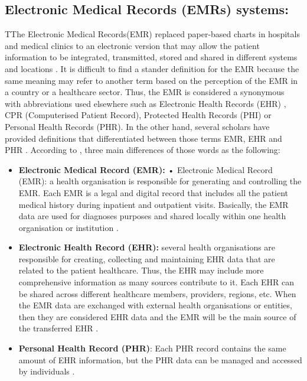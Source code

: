 \subsection{Electronic Medical Records (EMRs) systems:}

TThe Electronic Medical Records(EMR) replaced paper-based charts in hospitals and medical clinics to an electronic version that may allow the patient information to be integrated, transmitted, stored and shared in different systems and locations  \cite{Rahim2016}. It is difficult to find a stander definition for the EMR because the same meaning may refer to another term based on the perception of the EMR in a country or a healthcare sector. Thus, the EMR is considered a synonymous with abbreviations used elsewhere such as Electronic Health Records (EHR) \cite{WorldHealthOrganization2016,Rahim2016}, CPR (Computerised Patient Record), Protected Health Records (PHI) or Personal Health Records (PHR). In the other hand, several scholars have provided definitions that differentiated between those terms EMR, EHR and PHR \cite{Kierkegaard2011,Deutsch2010} . According to \cite{Yang2015,U.S.DepartmentofHealthandHumanServices2015}, three main differences of those words as the following:
\begin{itemize}
	\item\textbf{ Electronic Medical Record (EMR):} •	Electronic Medical Record (EMR): a health organisation is responsible for generating and controlling the EMR. Each EMR is a legal and digital record that includes all the patient medical history during inpatient and outpatient visits. Basically, the EMR data are used for diagnoses purposes and shared locally within one health organisation or institution \cite{Yang2015}. 
	\item \textbf{Electronic Health Record (EHR):} several health organisations are responsible for creating, collecting and maintaining EHR data that are related to the patient healthcare. Thus, the EHR may include more comprehensive information as many sources contribute to it. Each EHR can be shared across different healthcare members, providers, regions, etc. 
	When the EMR data are exchanged with external health organisations or entities, then they are considered EHR data and the EMR will be the main source of the transferred EHR \cite{Yang2015}.  
	\item \textbf{Personal Health Record (PHR)}: Each PHR record contains the same amount of EHR information, but the PHR data can be managed and accessed by individuals \cite{Yang2015,U.S.DepartmentofHealthandHumanServices2015}.
\end{itemize}

